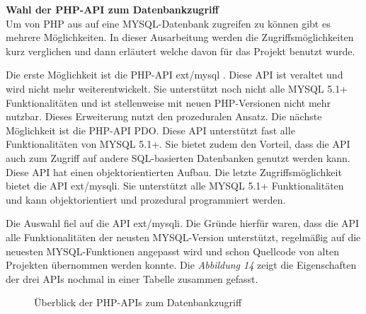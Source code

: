 \textbf{Wahl der PHP-API zum Datenbankzugriff}\\
Um von PHP aus auf eine MYSQL-Datenbank zugreifen zu können gibt es mehrere Möglichkeiten. In dieser Ausarbeitung werden die Zugriffsmöglichkeiten kurz verglichen und dann erläutert welche davon für das Projekt benutzt wurde.

Die erste Möglichkeit ist die PHP-API \glqq ext/mysql \grqq{}. Diese API ist veraltet und wird nicht mehr weiterentwickelt. Sie unterstützt noch nicht alle MYSQL 5.1+ Funktionalitäten und ist stellenweise mit neuen PHP-Versionen nicht mehr nutzbar. Dieses Erweiterung nutzt den prozeduralen Ansatz. Die nächste Möglichkeit ist die PHP-API \glqq PDO\grqq{}. Diese API unterstützt fast alle Funktionalitäten von MYSQL 5.1+. Sie bietet zudem den Vorteil, dass die API auch zum Zugriff auf andere SQL-basierten Datenbanken genutzt werden kann. Diese API hat einen objektorientierten Aufbau.  Die letzte Zugriffsmöglichkeit bietet die API \glqq ext/mysqli\grqq{}. Sie unterstützt alle MYSQL 5.1+ Funktionalitäten und kann objektorientiert und prozedural programmiert werden.

Die Auswahl fiel auf die API \glqq ext/mysqli\grqq{}. Die Gründe hierfür waren, dass die API alle Funktionalitäten der neusten MYSQL-Version unterstützt, regelmäßig auf die neuesten MYSQL-Funktionen angepasst wird und schon Quellcode von alten Projekten übernommen werden konnte. Die \textit{Abbildung 14} zeigt die Eigenschaften der drei APIs nochmal in einer Tabelle zusammen gefasst.
\begin{figure}[H]
	\begin{center}
	\end{center}
	\caption{Überblick der PHP-APIs zum Datenbankzugriff}
\end{figure}

